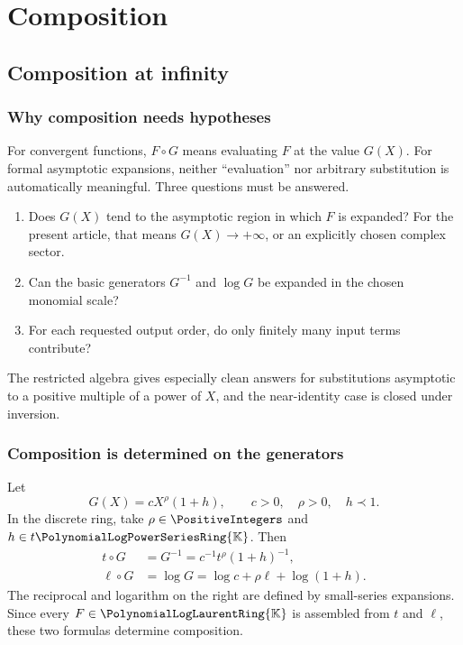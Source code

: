 \documentclass[11pt,oneside,openany]{book}
\newcommand{\K}{\mathbb{K}}
\newcommand{\Rring}{\PolynomialLogPowerSeriesRing{\K}}
\newcommand{\Pring}{\PolynomialLogLaurentRing{\K}}
\newcommand{\compose}{\mathbin{\circ}}
\begin{document}
\part{Composition}

\chapter{Composition at infinity}
\label{ch:composition}

\section{Why composition needs hypotheses}
For convergent functions, \(F\compose G\) means evaluating \(F\) at the value
\(G(X)\).  For formal asymptotic expansions, neither ``evaluation'' nor
arbitrary substitution is automatically meaningful.  Three questions must be
answered.

\begin{enumerate}
\item Does \(G(X)\) tend to the asymptotic region in which \(F\) is expanded?
For the present article, that means \(G(X)\to+\infty\), or an explicitly chosen
complex sector.
\item Can the basic generators \(G^{-1}\) and \(\log G\) be expanded in the
chosen monomial scale?
\item For each requested output order, do only finitely many input terms
contribute?
\end{enumerate}

The restricted algebra gives especially clean answers for substitutions
asymptotic to a positive multiple of a power of \(X\), and the near-identity
case is closed under inversion.

\section{Composition is determined on the generators}
Let
\begin{equation}\label{eq:generalinner}
  G(X)=cX^\rho(1+h),
  \qquad c>0,
  \quad \rho>0,
  \quad h\prec1.
\end{equation}
In the discrete ring, take \(\rho\in\PositiveIntegers\) and
\(h\in t\Rring\).  Then
\begin{align}
 t\compose G
 &=G^{-1}=c^{-1}t^\rho(1+h)^{-1},
 \label{eq:tcomposegeneral}\\
 \ell\compose G
 &=\log G=\log c+\rho\ell+\log(1+h).
 \label{eq:ellcomposegeneral}
\end{align}
The reciprocal and logarithm on the right are defined by small-series
expansions.  Since every \(F\in\Pring\) is assembled from \(t\) and \(\ell\),
these two formulas determine composition.
\end{document}
